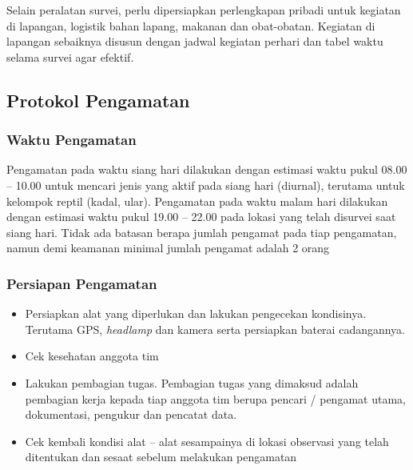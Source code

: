 \documentclass[
  oneside]{book}
\providecommand{\tightlist}{%
  \setlength{\itemsep}{0pt}\setlength{\parskip}{0pt}}
\begin{document}
Selain peralatan survei, perlu dipersiapkan perlengkapan pribadi untuk kegiatan di lapangan, logistik bahan lapang, makanan dan obat-obatan. Kegiatan di lapangan sebaiknya disusun dengan jadwal kegiatan perhari dan tabel waktu selama survei agar efektif.

\hypertarget{protokol-pengamatan-1}{%
\subsection*{Protokol Pengamatan}\label{protokol-pengamatan-1}}

\hypertarget{waktu-pengamatan}{%
\subsubsection*{Waktu Pengamatan}\label{waktu-pengamatan}}

Pengamatan pada waktu siang hari dilakukan dengan estimasi waktu pukul 08.00 -- 10.00 untuk mencari jenis yang aktif pada siang hari (diurnal), terutama untuk kelompok reptil (kadal, ular). Pengamatan pada waktu malam hari dilakukan dengan estimasi waktu pukul 19.00 -- 22.00 pada lokasi yang telah disurvei saat siang hari. Tidak ada batasan berapa jumlah pengamat pada tiap pengamatan, namun demi keamanan minimal jumlah pengamat adalah 2 orang

\hypertarget{persiapan-pengamatan}{%
\subsubsection*{Persiapan Pengamatan}\label{persiapan-pengamatan}}

\begin{itemize}
\tightlist
\item
  Persiapkan alat yang diperlukan dan lakukan pengecekan kondisinya. Terutama GPS, \emph{headlamp} dan kamera serta persiapkan baterai cadangannya.
\item
  Cek kesehatan anggota tim
\item
  Lakukan pembagian tugas. Pembagian tugas yang dimaksud adalah pembagian kerja kepada tiap anggota tim berupa pencari / pengamat utama, dokumentasi, pengukur dan pencatat data.
\item
  Cek kembali kondisi alat -- alat sesampainya di lokasi observasi yang telah ditentukan dan sesaat sebelum melakukan pengamatan
\end{itemize}
\end{document}
